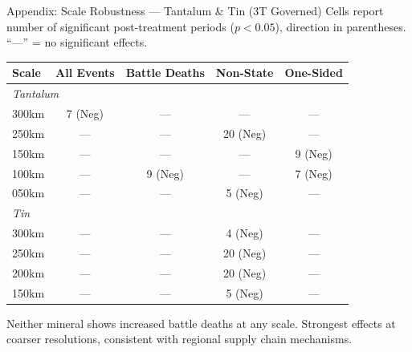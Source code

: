 \documentclass[aspectratio=169,11pt]{beamer}
\begin{document}
\begin{frame}{Appendix: Scale Robustness --- Tantalum \& Tin {\normalsize\color{muted}(3T Governed)}}
{\footnotesize Cells report number of significant post-treatment periods ($p<0.05$), direction in parentheses. ``---'' = no significant effects.}

\vspace{0.3em}
{\footnotesize
\begin{tabular}{lcccc}
\toprule
\textcolor{sage}{\textbf{Scale}} & \textcolor{sage}{\textbf{All Events}} & \textcolor{sage}{\textbf{Battle Deaths}} & \textcolor{sage}{\textbf{Non-State}} & \textcolor{sage}{\textbf{One-Sided}} \\
\midrule
\multicolumn{5}{l}{\textit{Tantalum}} \\
300km & 7 (Neg) & ---     & ---      & ---      \\
250km & ---     & ---     & 20 (Neg) & ---      \\
150km & ---     & ---     & ---      & 9 (Neg)  \\
100km & ---     & 9 (Neg) & ---      & 7 (Neg)  \\
050km & ---     & ---     & 5 (Neg)  & ---      \\
\midrule
\multicolumn{5}{l}{\textit{Tin}} \\
300km & ---     & ---     & 4 (Neg)  & ---      \\
250km & ---     & ---     & 20 (Neg) & ---      \\
200km & ---     & ---     & 20 (Neg) & ---      \\
150km & ---     & ---     & 5 (Neg)  & ---      \\
\bottomrule
\end{tabular}
}

\vspace{0.4em}
{\small\color{sage} Neither mineral shows increased battle deaths at any scale. Strongest effects at coarser resolutions, consistent with regional supply chain mechanisms.}
\end{frame}
\end{document}
